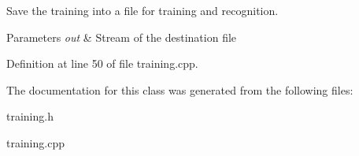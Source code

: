 Save the training into a file for training and recognition. 


\begin{DoxyParams}{Parameters}
{\em out} & Stream of the destination file \\
\hline
\end{DoxyParams}


Definition at line 50 of file training.\-cpp.



The documentation for this class was generated from the following files\-:\begin{DoxyCompactItemize}
\item 
training.\-h\item 
training.\-cpp\end{DoxyCompactItemize}
